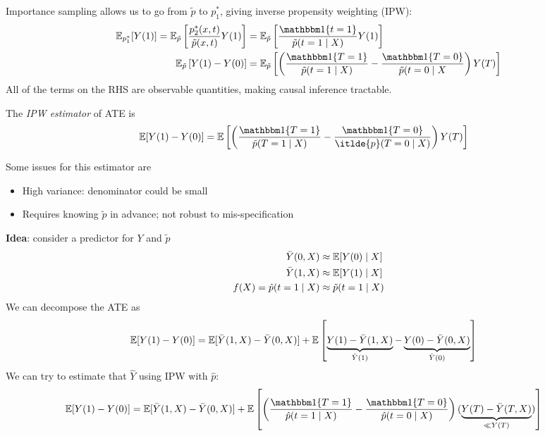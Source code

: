 Importance sampling allows us to go from $\tilde{p}$ to $p_1^*$,
giving inverse propensity weighting (IPW):
\begin{align}
  \ex_{p_1^*}[Y(1)] = \ex_{\tilde{p}}\left[
    \frac{p_2^*(x,t)}{\tilde{p}(x,t)} Y(1)
  \right]
  &= \ex_{\tilde{p}}\left[
    \frac{\ind\{t=1\}}{\tilde{p}(t=1 \mid X)} Y(1)
  \right] \\
  \ex_{\tilde{p}}\left[
    Y(1) - Y(0)
  \right] &= \ex_{\tilde{p}} \left[
  \left( \frac{\ind\{T=1\}}{\tilde{p}(t=1 \mid X)}  - \frac{\ind\{T=0\}}{\tilde{p}(t=0 \mid X} \right)
  Y(T)
  \right]
\end{align}
All of the terms on the RHS are observable quantities, making causal
inference tractable.

\begin{definition}
  The \emph{IPW estimator} of ATE is
  \begin{align}
    \ex[Y(1) - Y(0)]
    &= \ex\left[\left(
	\frac{\ind\{T=1\}}{\tilde{p}(T=1 \mid X)}
	- \frac{\ind\{T=0\}}{\itlde{p}(T=0 \mid X)}
      \right) Y(T)
    \right]
  \end{align}
\end{definition}

Some issues for this estimator are
\begin{itemize}
  \item High variance: denominator could be small
  \item Requires knowing $\tilde{p}$ in advance; not robust to
    mis-specification
\end{itemize}

\textbf{Idea}: consider a predictor for $Y$ and $\tilde{p}$
\begin{align}
  \bar{Y}(0, X) &\approx \mathbb{E}[Y(0) \mid X] \\
  \bar{Y}(1, X) &\approx \mathbb{E}[Y(1) \mid X] \\
  f(X) = \hat{p}(t=1 \mid X) &\approx \tilde{p}(t=1 \mid X)
\end{align}
We can decompose the ATE as
\begin{align}
  \mathbb{E}[Y(1) - Y(0)]
  &= \mathbb{E}[\bar{Y}(1, X) - \bar{Y}(0, X)]
  + \mathbb{E}\left[
    \underbrace{Y(1) - \bar{Y}(1, X)}_{\hat{Y}(1)}
    - \underbrace{Y(0) - \bar{Y}(0, X)}_{\hat{Y}(0)}
  \right]
\end{align}
We can try to estimate that $\hat{Y}$ using IPW with $\hat{p}$:
\begin{align}
  \ex[Y(1) - Y(0)]
  &= \ex[\bar{Y}(1, X) - \bar{Y}(0, X)]
  + \ex\left[\left(
      \frac{\ind\{T=1\}}{\hat{p}(t=1 \mid X)}
      - \frac{\ind\{T=0\}}{\hat{p}(t=0 \mid X)}
    \right) ( \underbrace{Y(T) - \bar{Y}(T, X)}_{\ll Y(T)} )
  \right]
\end{align}

